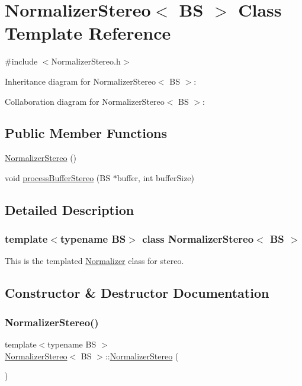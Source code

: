 \hypertarget{classNormalizerStereo}{}\section{Normalizer\+Stereo$<$ BS $>$ Class Template Reference}
\label{classNormalizerStereo}


{\ttfamily \#include $<$Normalizer\+Stereo.\+h$>$}



Inheritance diagram for Normalizer\+Stereo$<$ BS $>$\+:


Collaboration diagram for Normalizer\+Stereo$<$ BS $>$\+:
\subsection*{Public Member Functions}
\begin{DoxyCompactItemize}
\item 
\hyperlink{classNormalizerStereo_a43b36a0bfaace984d56e2fc90ee6b9d6}{Normalizer\+Stereo} ()
\item 
void \hyperlink{classNormalizerStereo_af6fb357ed8edaa88898280e1734d933e}{process\+Buffer\+Stereo} (BS $\ast$buffer, int buffer\+Size)
\end{DoxyCompactItemize}


\subsection{Detailed Description}
\subsubsection*{template$<$typename BS$>$\newline
class Normalizer\+Stereo$<$ B\+S $>$}

This is the templated \hyperlink{classNormalizer}{Normalizer} class for stereo. 

\subsection{Constructor \& Destructor Documentation}
\mbox{\label{classNormalizerStereo_a43b36a0bfaace984d56e2fc90ee6b9d6}} 
\subsubsection{\texorpdfstring{Normalizer\+Stereo()}{NormalizerStereo()}}
{\footnotesize\ttfamily template$<$typename BS $>$ \\
\hyperlink{classNormalizerStereo}{Normalizer\+Stereo}$<$ BS $>$\+::\hyperlink{classNormalizerStereo}{Normalizer\+Stereo} (\begin{DoxyParamCaption}{ }\end{DoxyParamCaption})}

